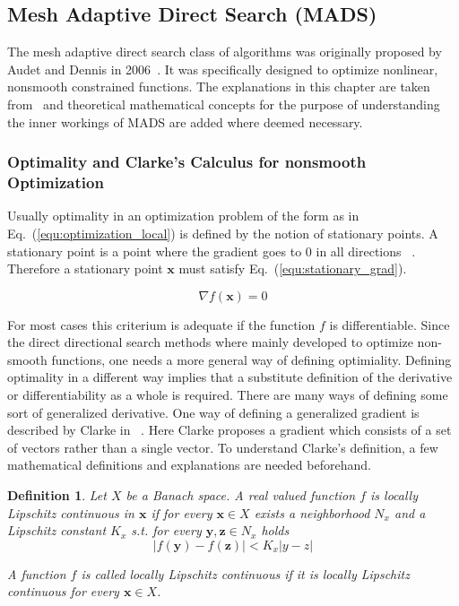 \documentclass[a4paper,10pt]{article}
\newtheorem{definition}{Definition}
\renewcommand{\vec}[1]{\mathbf{#1}}
\newcommand{\equref}[1]{Eq.~(\ref{#1})}
\begin{document}
    \subsection{Mesh Adaptive Direct Search (MADS)} \label{sec:mads}

    The mesh adaptive direct search class of algorithms was originally
    proposed by Audet and Dennis in 2006~\cite{mads_original}.
    It was specifically designed to optimize nonlinear, nonsmooth
    constrained functions.
    The explanations in this chapter are taken from~\cite{mads_original}
    and theoretical mathematical concepts for the purpose of understanding
    the inner workings of MADS are added where deemed necessary.

    \subsubsection{Optimality and Clarke's Calculus for nonsmooth Optimization} 
    \label{sec:optimality}

    Usually optimality in an optimization problem of the form as in
    \equref{equ:optimization_local} is defined by the notion of stationary
    points.
    A stationary point is a point where the gradient goes to 0 in all
    directions ~\cite{solomon_numerical}.
    Therefore a stationary point $\vec{x}$ must satisfy \equref{equ:stationary_grad}.

    \begin{equation}
        \label{equ:stationary_grad}
        \nabla f(\vec{x}) = 0
    \end{equation}

    For most cases this criterium is adequate if the function $f$ is differentiable.
    Since the direct directional search methods where mainly developed
    to optimize non-smooth functions, one needs a more general way
    of defining optimiality.
    Defining optimality in a different way implies that a substitute
    definition of the derivative or differentiability as a whole
    is required.
    There are many ways of defining some sort of generalized derivative.
    One way of defining a generalized gradient is described by Clarke
    in ~\cite{clarke}.
    Here Clarke proposes a gradient which consists of a set of vectors
    rather than a single vector.
    To understand Clarke's definition, a few mathematical definitions
    and explanations are needed beforehand.
    
    \begin{definition}
        \label{def:local_lipschitz}
        Let $X$ be a Banach space.
        A real valued function $f$ is locally Lipschitz continuous in $\vec{x}$
        if for every $\vec{x} \in X$ exists a neighborhood $N_x$ and a Lipschitz
        constant $K_x$ s.t. for every $\vec{y}, \vec{z} \in N_x$ holds 
        \begin{equation}
            |f(\vec{y}) - f(\vec{z})| < K_x|y - z|
        \end{equation}

        A function $f$ is called locally Lipschitz continuous if it is
        locally Lipschitz continuous for every $\vec{x} \in X$.
    \end{definition}
    
\end{document}
